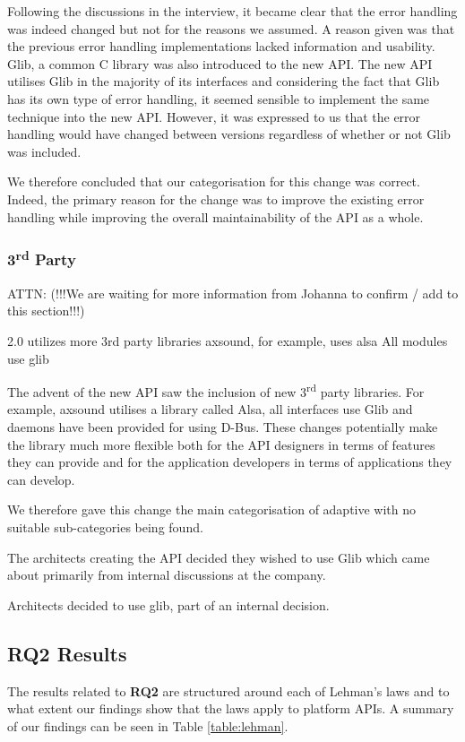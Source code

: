 \documentclass{sig-alternate}
\begin{document}
Following the discussions in the interview, it became clear that the error handling was indeed changed but not for the reasons we assumed. A reason given was that the previous error handling implementations lacked information and usability. Glib, a common C library was also introduced to the new API. The new API utilises Glib in the majority of its interfaces and considering the fact that Glib has its own type of error handling, it seemed sensible to implement the same technique into the new API. However, it was expressed to us that the error handling would have changed between versions regardless of whether or not Glib was included.

We therefore concluded that our categorisation for this change was correct. Indeed, the primary reason for the change was to improve the existing error handling while improving the overall maintainability of the API as a whole. 

\subsubsection{3\textsuperscript{rd} Party}
ATTN: (!!!We are waiting for more information from Johanna to confirm / add to this section!!!)

2.0 utilizes more 3rd party libraries
axsound, for example, uses alsa
All modules use glib

The advent of the new API saw the inclusion of new 3\textsuperscript{rd} party libraries. For example, axsound utilises a library called Alsa, all interfaces use Glib and daemons have been provided for using D-Bus. These changes potentially make the library much more flexible both for the API designers in terms of features they can provide and for the application developers in terms of applications they can develop.

We therefore gave this change the main categorisation of adaptive with no suitable sub-categories being found.


The architects creating the API decided they wished to use Glib which came about primarily from internal discussions at the company.

Architects decided to use glib, part of an internal decision. 


\subsection{RQ2 Results}
The results related to \textbf{RQ2} are structured around each of Lehman's laws and to what extent our findings show that the laws apply to platform APIs. A summary of our findings can be seen in Table \ref{table:lehman}. 
\end{document}
